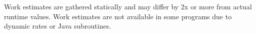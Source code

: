 \noindent Work estimates are gathered statically and may differ by 2x 
or more from actual runtime values.  Work estimates are not available
in some programs due to dynamic rates or Java subroutines.


\newcommand{\tallgraphcustom}[3]{
\clearpage
\begin{figure}[t!]
\vspace{-12pt}
\centering
\psfig{file=apps/#1.eps,height=\textheight}
\vspace{#3}
\caption{Stream graph for #2.\protect\label{fig:#1-graph}}
\vspace{-12pt}
\end{figure}}

\newcommand{\tallgraph}[2]{\tallgraphcustom{#1}{#2}{-12pt}}

\newcommand{\widegraph}[2]{
\clearpage
\begin{figure}[t!]
\vspace{-12pt}
\hspace{-0.025\textwidth}\psfig{file=apps/#1.eps,width=1.05\textwidth}
\vspace{-12pt}
\caption{Stream graph for #2.\protect\label{fig:#1-graph}}
\vspace{-12pt}
\end{figure}}

\newcommand{\smallgraph}[2]{
\clearpage
\begin{figure}[t!]
\vspace{-12pt}
\centering
\psfig{file=apps/#1.eps,scale=0.7}
\vspace{-12pt}
\caption{Stream graph for #2.\protect\label{fig:#1-graph}}
\vspace{-12pt}
\end{figure}}

